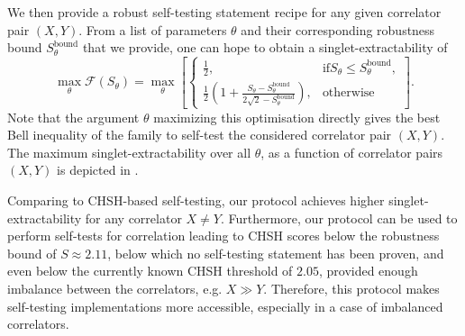We then provide a robust self-testing statement recipe for any given correlator pair $(X,Y)$.
From a list of parameters $\theta$ and their corresponding robustness bound $S_\theta^\text{bound}$ that we provide, one can hope to obtain a singlet-extractability of 
\begin{equation}
	\max_\theta \mathcal{F}(S_\theta) = \max_\theta \left[ \begin{cases}
			\frac{1}{2},& \text{if} S_\theta \leq S_\theta^\text{bound}, \\
			\frac{1}{2}\left(1+\frac{S_\theta - S_\theta^\text{bound}}{2\sqrt{2}-S_\theta^\text{bound}}\right), & \text{otherwise}
	\end{cases} \right].
	\label{eq:singlet-extractability-theta}
\end{equation}
Note that the argument $\theta$ maximizing this optimisation directly gives the best Bell inequality of the family  to self-test the considered correlator pair $(X,Y)$.
The maximum singlet-extractability over all $\theta$, as a function of correlator pairs $(X,Y)$ is depicted in .

Comparing to CHSH-based self-testing, our protocol achieves higher singlet-extractability for any correlator $X\neq Y$.
Furthermore, our protocol can be used to perform self-tests for correlation leading to CHSH scores below the robustness bound of $S\approx 2.11$, below which no self-testing statement has been proven, and even below the currently known CHSH threshold of $2.05$, provided enough imbalance between the correlators, e.g. $X \gg Y$.
Therefore, this protocol makes self-testing implementations more accessible, especially in a case of imbalanced correlators.

